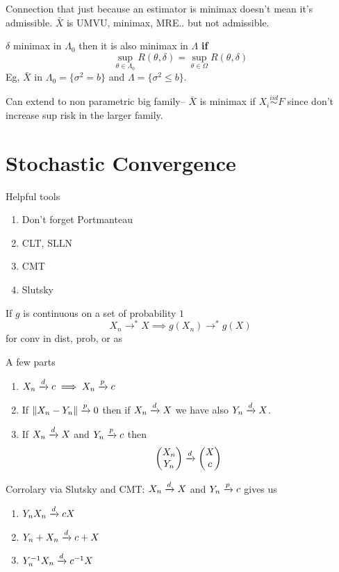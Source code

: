 \documentclass{article}
\newcommand{\simiid}{\overset{iid}\sim }
\begin{document}
Connection that just because an estimator is minimax doesn't mean it's admissible. $\bar X$ is UMVU, minimax, MRE.. but not admissible. 
\begin{recipe}
$\delta$ minimax in $\Lambda_0$ then it is also minimax in $\Lambda$ \textbf{if} 
$$\sup_{\theta\in \Lambda_0} R(\theta,\delta) = \sup_{\theta \in \Omega} R(\theta,\delta)$$
Eg, $\bar X$ in $\Lambda_0 = \{\sigma^2 = b\}$ and $\Lambda = \{\sigma^2 \leq b\}$. 
\end{recipe}
Can extend to non parametric big family-- $\bar X$ is minimax if $X_i \simiid F$ since don't increase sup risk in the larger family. 


\newpage
\section{Stochastic Convergence}
Helpful tools
\begin{enumerate}
	\item Don't forget Portmanteau
	\item CLT, SLLN 
	\item CMT
	\item Slutsky
\end{enumerate} 
\begin{theorem}[CMT]
If $g$ is continuous on a set of probability $1$
$$X_n\to^* X \implies g(X_n) \to^* g(X)$$
for conv in dist, prob, or as
\end{theorem}
\begin{theorem}[Slutsky]
A few parts
\begin{enumerate}
	\item $X_n \xrightarrow{d} c \implies X_n \xrightarrow{p} c$
	\item If $\|X_n - Y_n\| \xrightarrow{p} 0$ then if $X_n \xrightarrow{d} X$ we have also $Y_n \xrightarrow{d} X$. 
	\item If $X_n \xrightarrow{d} X$ and $Y_n \xrightarrow{p} c$ then
	$$\begin{pmatrix}
		X_n\\Y_n 
	\end{pmatrix}\xrightarrow{d} \begin{pmatrix}
		X\\c 
	\end{pmatrix}$$
	\end{enumerate}
	Corrolary via Slutsky and CMT:
	$X_n\xrightarrow{d} X$ and $Y_n \xrightarrow{p} c$ gives us 
	\begin{enumerate}
	\item $Y_n X_n \xrightarrow{d} cX$
	\item $Y_n + X_n \xrightarrow{d} c+ X$
	\item $Y_n^{-1} X_n \xrightarrow{d} c^{-1} X$
	\end{enumerate}

\end{theorem}
\end{document}
